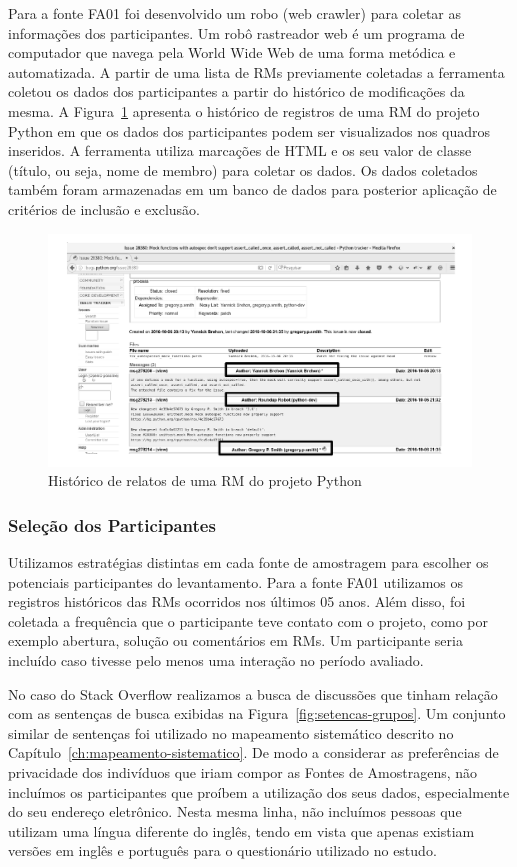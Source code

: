 Para a fonte FA01 foi desenvolvido um robo (web crawler) para coletar as
informações dos participantes. Um robô rastreador web é um programa de
computador que navega pela World Wide Web de uma forma metódica e automatizada.
A partir de uma lista de RMs previamente coletadas a ferramenta coletou os dados
dos participantes a partir do histórico de modificações da mesma. A
Figura~\ref{fig:historico-rm-python} apresenta o histórico de registros de uma
RM do projeto Python em que os dados dos participantes podem ser visualizados
nos quadros inseridos. A ferramenta utiliza marcações de HTML e os seu valor de
classe (título, ou seja, nome de membro) para coletar os dados. Os dados
coletados também foram armazenadas em um banco de dados para posterior aplicação
de critérios de inclusão e exclusão.

\begin{figure}[htpb]
	\centering
	\includegraphics[width=0.7\linewidth]{./chapter-pesquisa-com-profissionais/img/historico-rm-python.pdf}
	\caption{Histórico de relatos de uma RM do projeto Python}
\label{fig:historico-rm-python}
\end{figure}

\subsubsection{Seleção dos Participantes}
\label{subsubsec:pesquisa_profissionais_plano_pesquisa}

Utilizamos estratégias distintas em cada fonte de amostragem para escolher os
potenciais participantes do levantamento. Para a fonte FA01 utilizamos os
registros históricos das RMs ocorridos nos últimos 05 anos. Além disso, foi
coletada a frequência que o participante teve contato com o projeto, como por
exemplo abertura, solução ou comentários em RMs. Um participante seria incluído
caso tivesse pelo menos uma interação no período avaliado.

No caso do Stack Overflow realizamos a busca de discussões que tinham relação
com as sentenças de busca exibidas na Figura~\ref{fig:setencas-grupos}. Um
conjunto similar de sentenças foi utilizado no mapeamento sistemático descrito
no Capítulo~\ref{ch:mapeamento-sistematico}. De modo a considerar as
preferências de privacidade dos indivíduos que iriam compor as Fontes de
Amostragens, não incluímos os participantes que proíbem a utilização dos seus
dados, especialmente do seu endereço eletrônico. Nesta mesma linha, não
incluímos pessoas que utilizam uma língua diferente do inglês, tendo em vista
que apenas existiam versões em inglês e português para o questionário utilizado
no estudo.

